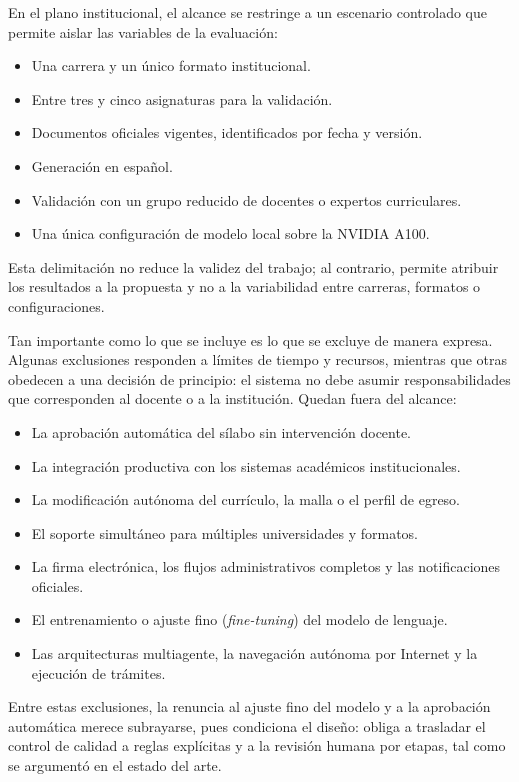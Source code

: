 En el plano institucional, el alcance se restringe a un escenario controlado que permite aislar las variables de la evaluación:
\begin{itemize}
  \item Una carrera y un único formato institucional.
  \item Entre tres y cinco asignaturas para la validación.
  \item Documentos oficiales vigentes, identificados por fecha y versión.
  \item Generación en español.
  \item Validación con un grupo reducido de docentes o expertos curriculares.
  \item Una única configuración de modelo local sobre la NVIDIA A100.
\end{itemize}
Esta delimitación no reduce la validez del trabajo; al contrario, permite atribuir los resultados a la propuesta y no a la variabilidad entre carreras, formatos o configuraciones.

Tan importante como lo que se incluye es lo que se excluye de manera expresa. Algunas exclusiones responden a límites de tiempo y recursos, mientras que otras obedecen a una decisión de principio: el sistema no debe asumir responsabilidades que corresponden al docente o a la institución. Quedan fuera del alcance:
\begin{itemize}
  \item La aprobación automática del sílabo sin intervención docente.
  \item La integración productiva con los sistemas académicos institucionales.
  \item La modificación autónoma del currículo, la malla o el perfil de egreso.
  \item El soporte simultáneo para múltiples universidades y formatos.
  \item La firma electrónica, los flujos administrativos completos y las notificaciones oficiales.
  \item El entrenamiento o ajuste fino (\textit{fine-tuning}) del modelo de lenguaje.
  \item Las arquitecturas multiagente, la navegación autónoma por Internet y la ejecución de trámites.
\end{itemize}
Entre estas exclusiones, la renuncia al ajuste fino del modelo y a la aprobación automática merece subrayarse, pues condiciona el diseño: obliga a trasladar el control de calidad a reglas explícitas y a la revisión humana por etapas, tal como se argumentó en el estado del arte.

